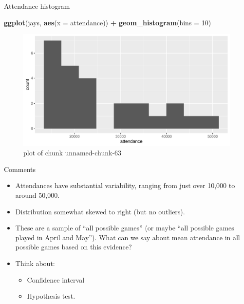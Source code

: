 \documentclass[ignorenonframetext,]{beamer}
\newenvironment{Shaded}{\begin{snugshade}}{\end{snugshade}}
\newcommand{\DataTypeTok}[1]{\textcolor[rgb]{0.13,0.29,0.53}{#1}}
\newcommand{\DecValTok}[1]{\textcolor[rgb]{0.00,0.00,0.81}{#1}}
\newcommand{\KeywordTok}[1]{\textcolor[rgb]{0.13,0.29,0.53}{\textbf{#1}}}
\newcommand{\NormalTok}[1]{#1}
\newcommand{\OperatorTok}[1]{\textcolor[rgb]{0.81,0.36,0.00}{\textbf{#1}}}
\newcommand{\StringTok}[1]{\textcolor[rgb]{0.31,0.60,0.02}{#1}}
\providecommand{\tightlist}{%
  \setlength{\itemsep}{0pt}\setlength{\parskip}{0pt}}
\begin{document}
\begin{frame}[fragile]{Attendance histogram}
\protect\hypertarget{attendance-histogram}{}

\begin{Shaded}
\begin{Highlighting}[]
\KeywordTok{ggplot}\NormalTok{(jays, }\KeywordTok{aes}\NormalTok{(}\DataTypeTok{x =}\NormalTok{ attendance)) }\OperatorTok{+}\StringTok{ }\KeywordTok{geom_histogram}\NormalTok{(}\DataTypeTok{bins =} \DecValTok{10}\NormalTok{)}
\end{Highlighting}
\end{Shaded}

\begin{figure}
\centering
\includegraphics{figure/unnamed-chunk-63-1.pdf}
\caption{plot of chunk unnamed-chunk-63}
\end{figure}

\end{frame}

\begin{frame}{Comments}
\protect\hypertarget{comments}{}

\begin{itemize}
\tightlist
\item
  Attendances have substantial variability, ranging from just over
  10,000 to around 50,000.
\item
  Distribution somewhat skewed to right (but no outliers).
\item
  These are a sample of ``all possible games'' (or maybe ``all possible
  games played in April and May''). What can we say about mean
  attendance in all possible games based on this evidence?
\item
  Think about:

  \begin{itemize}
  \tightlist
  \item
    Confidence interval
  \item
    Hypothesis test.
  \end{itemize}
\end{itemize}

\end{frame}
\end{document}
